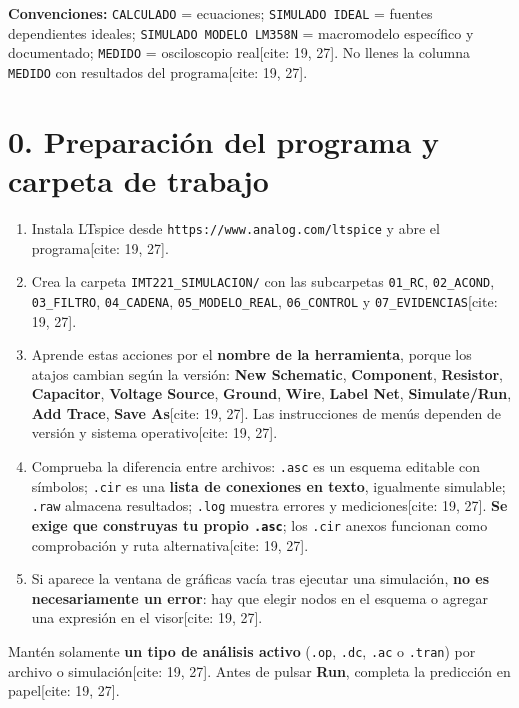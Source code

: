 \documentclass[10pt, a4paper]{article}
\begin{document}
\textbf{Convenciones:} \texttt{CALCULADO} = ecuaciones; \texttt{SIMULADO IDEAL} = fuentes dependientes ideales; \texttt{SIMULADO MODELO LM358N} = macromodelo específico y documentado; \texttt{MEDIDO} = osciloscopio real[cite: 19, 27]. No llenes la columna \texttt{MEDIDO} con resultados del programa[cite: 19, 27].

\section*{0. Preparación del programa y carpeta de trabajo}
\begin{enumerate}[noitemsep, leftmargin=*]
    \item Instala LTspice desde \texttt{https://www.analog.com/ltspice} y abre el programa[cite: 19, 27].
    \item Crea la carpeta \texttt{IMT221\_SIMULACION/} con las subcarpetas \texttt{01\_RC}, \texttt{02\_ACOND}, \texttt{03\_FILTRO}, \texttt{04\_CADENA}, \texttt{05\_MODELO\_REAL}, \texttt{06\_CONTROL} y \texttt{07\_EVIDENCIAS}[cite: 19, 27].
    \item Aprende estas acciones por el \textbf{nombre de la herramienta}, porque los atajos cambian según la versión: \textbf{New Schematic}, \textbf{Component}, \textbf{Resistor}, \textbf{Capacitor}, \textbf{Voltage Source}, \textbf{Ground}, \textbf{Wire}, \textbf{Label Net}, \textbf{Simulate/Run}, \textbf{Add Trace}, \textbf{Save As}[cite: 19, 27]. Las instrucciones de menús dependen de versión y sistema operativo[cite: 19, 27].
    \item Comprueba la diferencia entre archivos: \texttt{.asc} es un esquema editable con símbolos; \texttt{.cir} es una \textbf{lista de conexiones en texto}, igualmente simulable; \texttt{.raw} almacena resultados; \texttt{.log} muestra errores y mediciones[cite: 19, 27]. \textbf{Se exige que construyas tu propio \texttt{.asc}}; los \texttt{.cir} anexos funcionan como comprobación y ruta alternativa[cite: 19, 27].
    \item Si aparece la ventana de gráficas vacía tras ejecutar una simulación, \textbf{no es necesariamente un error}: hay que elegir nodos en el esquema o agregar una expresión en el visor[cite: 19, 27].
\end{enumerate}

\begin{tcolorbox}[colback=blue!5, colframe=ucbblue, title=\textbf{Regla Operativa de la Guía}]
    Mantén solamente \textbf{un tipo de análisis activo} (\texttt{.op}, \texttt{.dc}, \texttt{.ac} o \texttt{.tran}) por archivo o simulación[cite: 19, 27]. Antes de pulsar \textbf{Run}, completa la predicción en papel[cite: 19, 27].
\end{tcolorbox}
\end{document}
